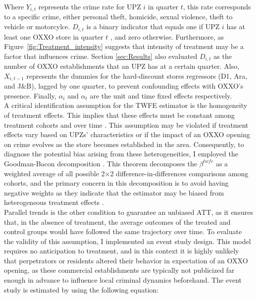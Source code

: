 \documentclass[12pt]{article}
\begin{document}
Where $ Y_{i,t}$ represents the crime rate for UPZ $i$ in quarter $t$, this rate corresponds to  a specific crime, either personal theft, homicide, sexual violence, theft to vehicle or motorcylce. $D_{i,t}$ is a binary indicator that equals one if UPZ $i$ has at least one OXXO store in quarter $t$ , and zero otherwise. Furthermore, as Figure~\ref{fig:Treatment_intensity} suggests that intensity of treatment may be a factor that influences crime. Section \ref{sec:Results} also evaluated $D_{i,t}$ as the number of OXXO establishments that an UPZ has at a certain quarter. Also, $X_{i,t-1}$ represents the dummies for the hard-discount stores regressors (D1, Ara, and J\&B), lagged by one quarter, to prevent confounding effects with OXXO's presence. Finally, $\alpha_i$ and  $\alpha_t$ are the unit and time fixed effects respectively.\\

A critical identification assumption for the TWFE estimator is the homogeneity of treatment effects. This implies that these effects must be constant among treatment cohorts and over time \parencite{deChaisemartin2023survey}. This assumption may be violated if treatment effects vary based on UPZs’ characteristics or if the impact of an OXXO opening on crime evolves as the store becomes established in the area. Consequently, to diagnose the potential bias arising from these heterogeneities, I employed the Goodman-Bacon decomposition \parencite{GoodmanBacon2021}.  This theorem decomposes the $\beta^{twfe}$ as a weighted average of all possible 2×2 difference-in-differences comparisons among cohorts, and the primary concern in this decomposition is to avoid having negative weights as they indicate that the estimator may be biased from heterogeneous treatment effects \parencite{GoodmanBacon2021}.\\

Parallel trends is the other condition to guarantee an unbiased ATT, as it ensures that, in the absence of treatment, the average outcomes of the treated and control groups would have followed the same trajectory over time. To evaluate the validity of this assumption, I implemented an event study design. This model requires no anticipation to treatment, and in this context it is highly unlikely that perpetrators or residents altered their behavior in expectation of an OXXO opening, as these commercial establishments are typically not publicized far enough in advance to influence local criminal dynamics beforehand. The event study is estimated by using the following equation:
\end{document}
